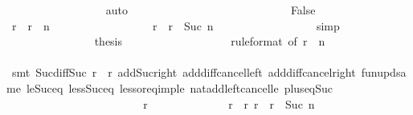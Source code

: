 \begin{isabellebody}
\ \ \ \ \ \ \ \ \ \ \ \ \ \ \ \ \isamarkupfalse%
\ auto\isanewline
\ \ \ \ \ \ \ \ \ \ \ \ \isamarkupfalse%
\isanewline
\ \ \ \ \ \ \ \ \ \ \ \ \ \ \isamarkupfalse%
\ False\isanewline
\ \ \ \ \ \ \ \ \ \ \ \ \ \ \isamarkupfalse%
\ {\isachardoublequoteopen}r\ {\isacharequal}\ r{}\ {\isacharplus}\ n{\isachardoublequoteclose}\isanewline
\ \ \ \ \ \ \ \ \ \ \ \ \ \ \ \ \isamarkupfalse%
\ {\isacharbackquoteopen}r\ {\isacharless}\ r{}\ {\isacharplus}\ Suc\ n{\isacharbackquoteclose}\isanewline
\ \ \ \ \ \ \ \ \ \ \ \ \ \ \ \ \isamarkupfalse%
\ simp\isanewline
\ \ \ \ \ \ \ \ \ \ \ \ \ \ \isamarkupfalse%
\ {\isacharquery}thesis\isanewline
\ \ \ \ \ \ \ \ \ \ \ \ \ \ \ \ \isamarkupfalse%
\ {\isacharasterisk}{\isacharparenleft}{}{\isacharparenright}\ {\isacharasterisk}{\isacharparenleft}{}{\isacharparenright}{\isacharbrackleft}rule{\isacharunderscore}format{\isacharcomma}\ of\ {\isachardoublequoteopen}r{}\ {\isacharplus}\ n\ {\isacharminus}\ {}{\isachardoublequoteclose}{\isacharbrackright}\isanewline
\ \ \ \ \ \ \ \ \ \ \ \ \ \ \ \ \isamarkupfalse%
\ {\isacharparenleft}smt\ Suc{\isacharunderscore}diff{\isacharunderscore}Suc\ {\isacartoucheopen}r{}\ {\isacharless}\ r{\isacartoucheclose}\ add{\isacharunderscore}Suc{\isacharunderscore}right\ add{\isacharunderscore}diff{\isacharunderscore}cancel{\isacharunderscore}left{\isacharprime}\ add{\isacharunderscore}diff{\isacharunderscore}cancel{\isacharunderscore}right{\isacharprime}\ fun{\isacharunderscore}upd{\isacharunderscore}same\ le{\isacharunderscore}Suc{\isacharunderscore}eq\ less{\isacharunderscore}Suc{\isacharunderscore}eq\ less{\isacharunderscore}or{\isacharunderscore}eq{\isacharunderscore}imp{\isacharunderscore}le\ nat{\isacharunderscore}add{\isacharunderscore}left{\isacharunderscore}cancel{\isacharunderscore}le\ plus{\isacharunderscore}{}{\isacharunderscore}eq{\isacharunderscore}Suc{\isacharparenright}\isanewline
\ \ \ \ \ \ \ \ \ \ \ \ \isamarkupfalse%
\isanewline
\ \ \ \ \ \ \ \ \ \ \isamarkupfalse%
\isanewline
\ \ \ \ \ \ \ \ \ \ \ \ \isamarkupfalse%
\ r\isanewline
\ \ \ \ \ \ \ \ \ \ \ \ \isamarkupfalse%
\ {\isachardoublequoteopen}r{}\ {\isacharless}\ r{\isachardoublequoteclose}\ {\isachardoublequoteopen}r\ {\isacharless}\ r{}\ {\isacharplus}\ Suc\ n{\isachardoublequoteclose}\isanewline

\end{isabellebody}
